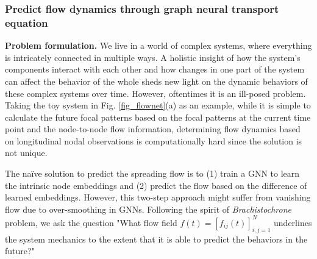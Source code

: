 \documentclass{article}
\begin{document}
\subsubsection{Predict flow dynamics through graph neural transport equation}
\label{flownet}
\textbf{Problem formulation.} We live in a world of complex systems, where everything is intricately connected in multiple ways. A holistic insight of how the system's components interact with each other and how changes in one part of the system can affect the behavior of the whole sheds new light on the dynamic behaviors of these complex systems over time. However, oftentimes it is an ill-posed problem. Taking the toy system in Fig. \ref{fig_flownet}(a) as an example, while it is simple to calculate the future focal patterns based on the focal patterns at the current time point and the node-to-node flow information, determining flow dynamics based on longitudinal nodal observations is computationally hard since the solution is not unique.

The na\"ive solution to predict the spreading flow is to (1) train a GNN to learn the intrinsic node embeddings and (2) predict the flow based on the difference of learned embeddings. However, this two-step approach might suffer from vanishing flow due to over-smoothing in GNNs. Following the spirit of \textit{Brachistochrone} problem, we ask the question "What flow field $f(t) =[f_{ij}(t)]_{i,j=1}^N$ underlines the system mechanics to the extent that it is able to predict the behaviors in the future?"
\end{document}
